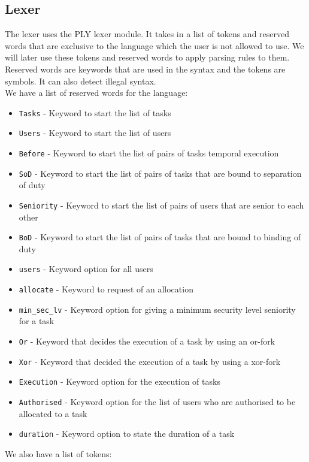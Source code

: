 \documentclass[a4paper]{report}
\begin{document}
\subsection{Lexer}
The lexer uses the PLY lexer module. It takes in a list of tokens and reserved words that are exclusive to the language which the user is not allowed to use. We will later use these tokens and reserved words to apply parsing rules to them. Reserved words are keywords that are used in the syntax and the tokens are symbols. It can also detect illegal syntax.\\
We have a list of reserved words for the language:
\begin{itemize}
\item \texttt{Tasks} - Keyword to start the list of tasks
\item \texttt{Users} - Keyword to start the list of users
\item \texttt{Before} - Keyword to start the list of pairs of tasks temporal execution
\item \texttt{SoD} - Keyword to start the list of pairs of tasks that are bound to separation of duty
\item \texttt{Seniority} - Keyword to start the list of pairs of users that are senior to each other
\item \texttt{BoD} - Keyword to start the list of pairs of tasks that are bound to binding of duty
\item \texttt{users} - Keyword option for all users
\item \texttt{allocate} - Keyword to request of an allocation
\item \texttt{min\_sec\_lv} - Keyword option for giving a minimum security level seniority for a task
\item \texttt{Or} - Keyword that decides the execution of a task by using an or-fork
\item \texttt{Xor} - Keyword that decided the execution of a task by using a xor-fork
\item \texttt{Execution} - Keyword option for the execution of tasks
\item \texttt{Authorised} - Keyword option for the list of users who are authorised to be allocated to a task
\item \texttt{duration} - Keyword option to state the duration of a task
\end{itemize}
We also have a list of tokens:
\end{document}
